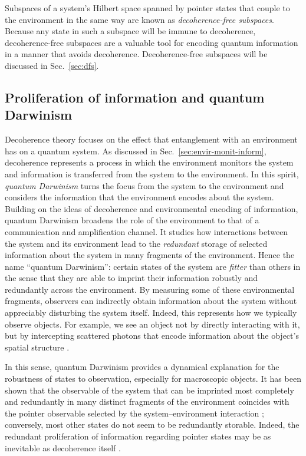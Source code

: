 \documentclass[3p,sort&compress]{elsarticle}
\begin{document}
Subspaces of a system's Hilbert space spanned by pointer states that couple to the environment in the same way are known as \emph{decoherence-free subspaces}. Because any state in such a subspace will be immune to decoherence, decoherence-free subspaces are a valuable tool for encoding quantum information in a manner that avoids decoherence. Decoherence-free subspaces will be discussed in Sec.~\ref{sec:dfs}.

\subsection{\label{sec:prol-inform-quant}Proliferation of information and quantum Darwinism}

Decoherence theory focuses on the effect that entanglement with an environment has on a quantum system. As discussed in Sec.~\ref{sec:envir-monit-inform}, decoherence represents a process in which the environment monitors the system and information is transferred from the system to the environment. In this spirit, \emph{quantum Darwinism} \cite{Zurek:2003:pl,Ollivier:2003:za,Ollivier:2004:im,Blume:2004:oo,Blume:2005:oo,Zurek:2009:om,Riedel:2010:un,Riedel:2011:un,Riedel:2012:un,Zurek:2014:xx, Zwolak:2016:zz,Zwolak:2017:mm,Zurek:2018:on,Unden:2018:ia} turns the focus from the system to the environment and considers the information that the environment encodes about the system. Building on the ideas of decoherence and environmental encoding of information, quantum Darwinism broadens the role of the environment to that of a communication and amplification channel. It studies how interactions between the system and its environment lead to the \emph{redundant} storage of selected information about the system in many fragments of the environment. Hence the name ``quantum Darwinism'': certain states of the system are \emph{fitter} than others in the sense that they are able to imprint their information robustly and redundantly across the environment.  By measuring some of these environmental fragments, observers can indirectly obtain information about the system without appreciably disturbing the system itself. Indeed, this represents how we typically observe objects. For example, we see an object not by directly interacting with it, but by intercepting scattered photons that encode information about the object's spatial structure \cite{Riedel:2010:un,Riedel:2011:un}. 

In this sense, quantum Darwinism provides a dynamical explanation for the robustness of states to observation, especially for macroscopic objects. It has been shown that the observable of the system that can be imprinted most completely and redundantly in many distinct fragments of the environment coincides with the pointer observable selected by the system--environment interaction  \cite{Ollivier:2003:za,Ollivier:2004:im,Blume:2004:oo,Blume:2005:oo}; conversely, most other states do not seem to be redundantly storable. Indeed, the redundant proliferation of information regarding pointer states may be as inevitable as decoherence itself \cite{Zwolak:2014:tt}. 
\end{document}
